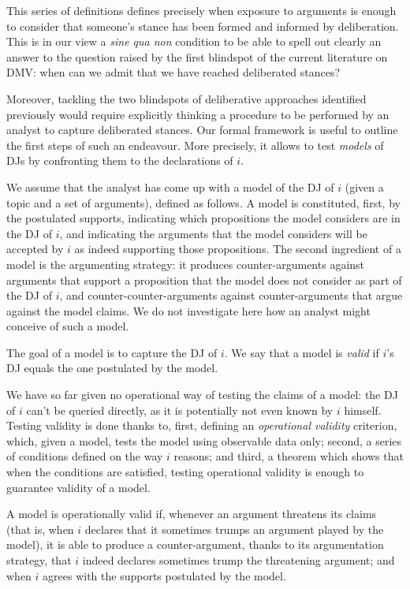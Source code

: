 \documentclass[version=3.21, pagesize, twoside=off, bibliography=totoc, DIV=calc, fontsize=12pt, a4paper, french, english]{scrartcl}
\begin{document}
This series of definitions defines precisely when exposure to arguments is enough to consider that someone’s stance has been formed and informed by deliberation. 
This is in our view a \emph{sine qua non} condition to be able to spell out clearly an answer to the question raised by the first blindspot of the current literature on DMV: when can we admit that we have reached deliberated stances?

Moreover, tackling the two blindspots of deliberative approaches identified previously would require explicitly thinking a procedure to be performed by an analyst to capture deliberated stances. Our formal framework is useful to outline the first steps of such an endeavour. More precisely, it allows to test \emph{models} of \acp{DJ} by confronting them to the declarations of $i$.

We assume that the analyst has come up with a model of the \ac{DJ} of $i$ (given a topic and a set of arguments), defined as follows. A model is constituted, first, by the postulated supports, indicating which propositions the model considers are in the \ac{DJ} of $i$, and indicating the arguments that the model considers will be accepted by $i$ as indeed supporting those propositions. The second ingredient of a model is the argumenting strategy: it produces counter-arguments against arguments that support a proposition that the model does not consider as part of the \ac{DJ} of $i$, and counter-counter-arguments against counter-arguments that argue against the model claims. We do not investigate here how an analyst might conceive of such a model.

The goal of a model is to capture the \ac{DJ} of $i$. We say that a model is \emph{valid} if $i$’s \ac{DJ} equals the one postulated by the model.

We have so far given no operational way of testing the claims of a model: the \ac{DJ} of $i$ can’t be queried directly, as it is potentially not even known by $i$ himself. Testing validity is done thanks to, first, defining an \emph{operational validity} criterion, which, given a model, tests the model using observable data only; second, a series of conditions defined on the way $i$ reasons; and third, a theorem which shows that when the conditions are satisfied, testing operational validity is enough to guarantee validity of a model.

A model is operationally valid if, whenever an argument threatens its claims (that is, when $i$ declares that it sometimes trumps an argument played by the model), it is able to produce a counter-argument, thanks to its argumentation strategy, that $i$ indeed declares sometimes trump the threatening argument; and when $i$ agrees with the supports postulated by the model.
\end{document}
